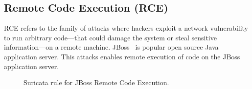 \documentclass[sigconf,review, anonymous]{acmart}
\begin{document}
\begin{figure}[h]
  \vspace{-2ex}
  
  \vspace{-3ex}  
\end{figure}



\subsection{Remote Code Execution (RCE)}
\label{sec:rce}
\label{sec:jboss}
\label{sec:content-example}


RCE refers to the family of attacks where hackers exploit a network
vulnerability to run arbitrary code---that could damage the system or
steal sensitive information---on a remote machine. JBoss~\cite{jboss}
is popular open source Java application server. This attacks enables
remote execution of code on the JBoss application server.



\begin{figure}[H]
  
  \caption{\label{fig:rule-jboss}Suricata rule for JBoss Remote Code Execution.}
\end{figure}

\end{document}
